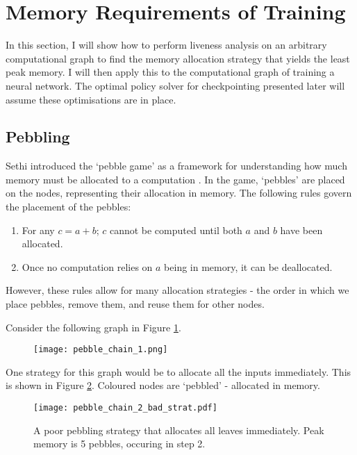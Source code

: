 \section{Memory Requirements of Training} \label{sec:2-4-memory-analysis}
In this section, I will show how to perform liveness analysis on an arbitrary computational graph to find the memory allocation strategy that yields the least peak memory.
I will then apply this to the computational graph of training a neural network.
The optimal policy solver for checkpointing presented later will assume these optimisations are in place.

\subsection{Pebbling}
Sethi introduced the `pebble game' as a framework for understanding how much memory must be allocated to a computation \cite{Sethi1973}.
In the game, `pebbles' are placed on the nodes, representing their allocation in memory.
The following rules govern the placement of the pebbles:
\begin{enumerate}[topsep=0.1em]
    \item For any \(c = a+b\); \(c\) cannot be computed until both \(a\) and \(b\) have been allocated.
    \item Once no computation relies on \(a\) being in memory, it can be deallocated.
\end{enumerate}
However, these rules allow for many allocation strategies - the order in which we place pebbles, remove them, and reuse them for other nodes.

Consider the following graph in Figure \ref{fig:2-chain-to-pebble}.

\begin{figure}[h]
    \centering
    \texttt{[image: pebble\_chain\_1.png]}
    \caption{}
    \label{fig:2-chain-to-pebble}
\end{figure}

One strategy for this graph would be to allocate all the inputs immediately.
This is shown in Figure \ref{fig:2-pebble-chain-bad}.
Coloured nodes are `pebbled' - allocated in memory.

\begin{figure}[hp]
    \centering
    \texttt{[image: pebble\_chain\_2\_bad\_strat.pdf]}
    \caption{A poor pebbling strategy that allocates all leaves immediately. Peak memory is 5 pebbles, occuring in step 2.}
    \label{fig:2-pebble-chain-bad}
\end{figure}

